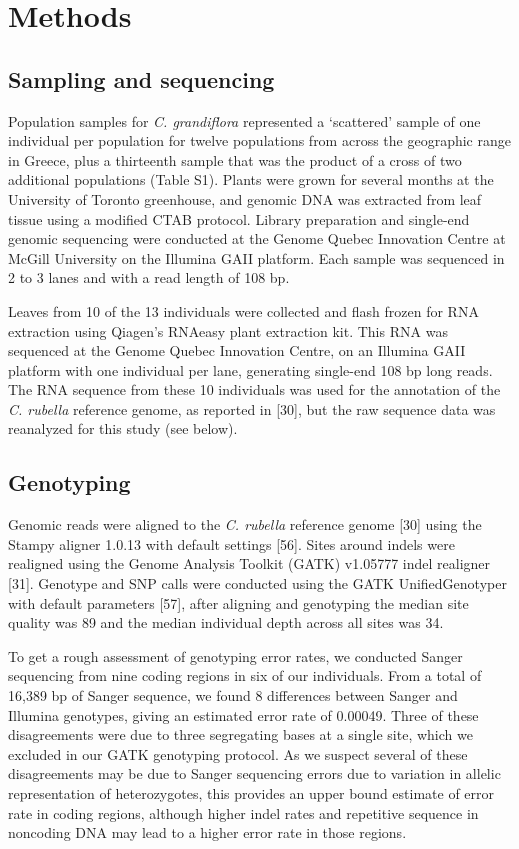 \section{Methods}
\subsection{Sampling and sequencing}
Population samples for \textit{C. grandiflora} represented a ‘scattered’ sample of one individual per population for twelve populations from across the geographic range in Greece, plus a thirteenth sample that was the product of a cross of two additional populations (Table S1). Plants were grown for several months at the University of Toronto greenhouse, and genomic DNA was extracted from leaf tissue using a modified CTAB protocol. Library preparation and single-end genomic sequencing were conducted at the Genome Quebec Innovation Centre at McGill University on the Illumina GAII platform. Each sample was sequenced in 2 to 3 lanes and with a read length of 108 bp.

Leaves from 10 of the 13 individuals were collected and flash frozen for RNA extraction using Qiagen's RNAeasy plant extraction kit. This RNA was sequenced at the Genome Quebec Innovation Centre, on an Illumina GAII platform with one individual per lane, generating single-end 108 bp long reads. The RNA sequence from these 10 individuals was used for the annotation of the \textit{C. rubella} reference genome, as reported in [30], but the raw sequence data was reanalyzed for this study (see below).

\subsection{Genotyping}
Genomic reads were aligned to the \textit{C. rubella} reference genome [30] using the Stampy aligner 1.0.13 with default settings [56]. Sites around indels were realigned using the Genome Analysis Toolkit (GATK) v1.05777 indel realigner [31]. Genotype and SNP calls were conducted using the GATK UnifiedGenotyper with default parameters [57], after aligning and genotyping the median site quality was 89 and the median individual depth across all sites was 34. 

To get a rough assessment of genotyping error rates, we conducted Sanger sequencing from nine coding regions in six of our individuals. From a total of 16,389 bp of Sanger sequence, we found 8 differences between Sanger and Illumina genotypes, giving an estimated error rate of 0.00049. Three of these disagreements were due to three segregating bases at a single site, which we excluded in our GATK genotyping protocol. As we suspect several of these disagreements may be due to Sanger sequencing errors due to variation in allelic representation of heterozygotes, this provides an upper bound estimate of error rate in coding regions, although higher indel rates and repetitive sequence in noncoding DNA may lead to a higher error rate in those regions. 

